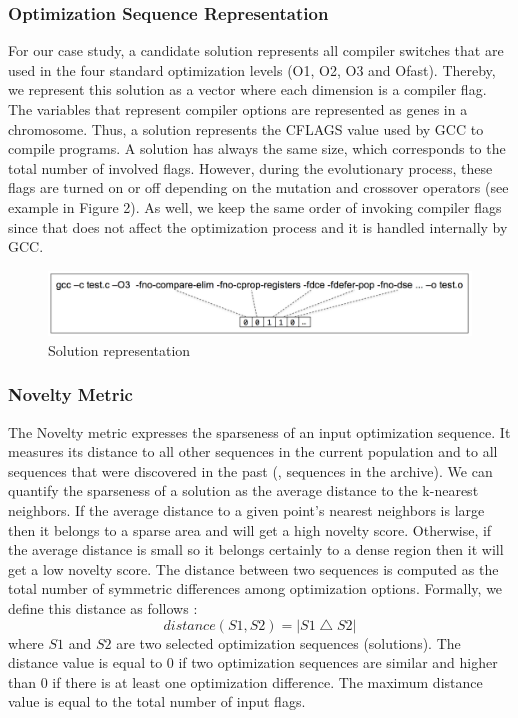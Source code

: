\subsubsection{Optimization Sequence Representation}
For our case study, a candidate solution represents all compiler switches that are used in the four standard optimization levels (O1, O2, O3 and Ofast). Thereby, we represent this solution as a vector where each dimension is a compiler flag. 
The variables that represent compiler options are represented as genes in a chromosome. 
Thus, a solution represents the CFLAGS value used by GCC to compile programs.
A solution has always the same size, which corresponds to the total number of involved flags. 
However, during the evolutionary process, these flags are turned on or off depending on the mutation and crossover operators (see example in Figure 2). As well, we keep the same order of invoking compiler flags since that does not affect the optimization process and it is handled internally by GCC.
\begin{figure}[h]
	\centering
	\includegraphics[width=1\hsize]{Ressources/individual.png}
	\caption{Solution representation}
	
\end{figure}

\subsubsection{Novelty Metric}
The Novelty metric expresses the sparseness of an input optimization sequence. It measures its distance to all other sequences in the current population and to all sequences that were discovered in the past (\ie, sequences in the archive). 
We can quantify the sparseness of a solution as the average distance to the k-nearest neighbors. 
If the average distance to a given point's nearest neighbors is large then it belongs to a sparse area and will get a high novelty score. 
Otherwise, if the average distance is small so it belongs certainly to a dense region then it will get a low novelty score. 
The distance between two sequences is computed as the total number of symmetric differences among optimization options. Formally, we define this distance as follows :
\begin{equation}
distance(S1,S2)=\left | S1 \bigtriangleup S2 \right |
\end{equation}
where $S1$ and $S2$ are two selected optimization sequences (solutions). The distance value is equal to 0 if two optimization sequences are similar and higher than 0 if there is at least one optimization difference. The maximum distance value is equal to the total number of input flags.

